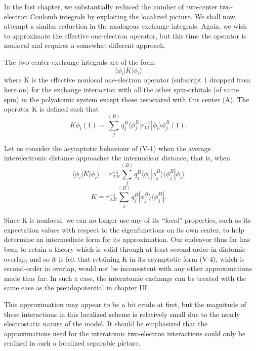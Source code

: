 \documentclass[12pt,letterpaper]{report}
\begin{document}
In the last chapter, we substantially reduced the number of two-center two-electron Coulomb integrals by exploiting the localized picture. We shall now attempt a similar reduction in the analogous exchange integrals. Again, we wish to approximate the effective one-electron operator, but this time the operator is nonlocal and requires a somewhat different approach.

The two-center exchange integrals are of the form
\begin{equation}
\langle \phi_i | K | \phi_i \rangle
\end{equation}
where K is the effective nonlocal one-electron operator (subscript 1 dropped from here on) for the exchange interaction with all the other spin-orbitals (of same spin) in the polyatomic system except those associated with this center (A). The operator K is defined such that
\begin{equation}
K\phi_i(1) = \sum_j^{(B)} q_j^B \langle \phi_j^B | r_{12}^{-1} | \phi_i \rangle \phi_j^B(1).
\end{equation}

Let us consider the asymptotic behaviour of (V-1) when the average interelectronic distance approaches the internuclear distance, that is, when
\begin{equation}
\langle \phi_i | K | \phi_i \rangle = r_{AB}^{-1} \sum_j^{(B)} q_j^B \langle \phi_i | \phi_j^B \rangle \langle \phi_j^B | \phi_i \rangle
\end{equation}
\begin{equation}
K = r_{AB}^{-1} \sum_j^{(B)} q_j^B |\phi_j^B \rangle \langle \phi_j^B|.
\end{equation}

Since K is nonlocal, we can no longer use any of its ``local'' properties, such as its expectation values with respect to the eigenfunctions on its own center, to help determine an intermediate form for its approximation. Our endeavor thus far has been to retain a theory which is valid through at least second-order in diatomic overlap, and so it is felt that retaining K in its asymptotic form (V-4), which is second-order in overlap, would not be inconsistent with any other approximations made thus far. In such a case, the interatomic exchange can be treated with the same ease as the pseudopotential in chapter III.

This approximation may appear to be a bit crude at first, but the magnitude of these interactions in this localized scheme is relatively small due to the nearly electrostatic nature of the model. It should be emphasized that the approximations used for the interatomic two-electron interactions could only be realized in such a localized separable picture.
\end{document}
